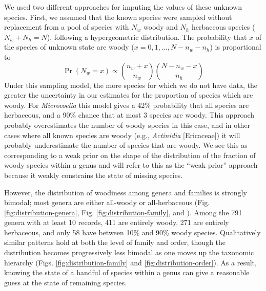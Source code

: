 We used two different approaches for imputing the values of these
unknown species. First, we assumed that the known species were sampled
without replacement from a pool of species with $N_w$ woody and $N_h$
herbaceous species ($N_w + N_h = N$), following a hypergeometric
distribution. The probability that $x$ of the species of unknown state
are woody ($x = 0, 1, \ldots, N - n_w - n_h$) is proportional to
\begin{equation}
  \Pr(N_w = x) \propto {n_w + x \choose n_w}
  {N - n_w - x \choose n_h}
\end{equation}
Under this sampling model, the more species for which we do not have data,
the greater the uncertainty in our estimates for the proportion of species
which are woody.
%
For \textit{Microcoelia} this model gives a 42\% probability that all
species are herbaceous, and a 90\% chance that at most 3 species
are woody.
This approach probably overestimates the number of woody species in
this case, and in other cases where all known species are woody (e.g.,
\textit{Actinidia} [Ericaceae]) it will probably underestimate the
number of species that are woody. We see this as corresponding to a
weak prior on the shape of the distribution of the fraction of woody
species within a genus and will refer to this as the ``weak prior''
approach because it weakly constrains the state of missing species.

However, the distribution of woodiness among genera and families is
strongly bimodal; most genera are either all-woody or all-herbaceous
(Fig. \ref{fig:distribution-genera}, Fig. \ref{fig:distribution-family}, and 
\citealt{sinnott1915evolution}).  Among the 791 genera with at least 10
records, 411 are entirely woody, 271 are entirely herbaceous, and only
58 have between 10\% and 90\% woody species. Qualitatively similar patterns
hold at both the level of family and order, though the distribution
becomes progressively less bimodal as one moves up the taxonomic hierarchy 
(Figs. \ref{fig:distribution-family} and \ref{fig:distribution-order}). 
As a result, knowing the state of a handful of species within a genus 
can give a reasonable guess at the state of remaining species.

